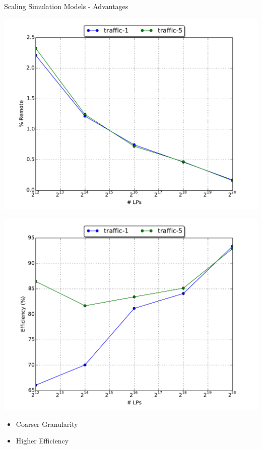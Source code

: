\documentclass[10pt]{beamer}
\begin{document}
\begin{frame}{Scaling Simulation Models - Advantages}
    \begin{minipage}{0.5\textwidth}
        \includegraphics[width=\textwidth]{../figs/scale/scale_premote_traffic.pdf}
    \end{minipage}%
    \begin{minipage}{0.5\textwidth}
        \includegraphics[width=\textwidth]{../figs/scale/scale_efficiency_traffic.pdf}
    \end{minipage}
    \begin{itemize}
        \item Coarser Granularity
        \item Higher Efficiency
    \end{itemize}
\end{frame}
\end{document}
